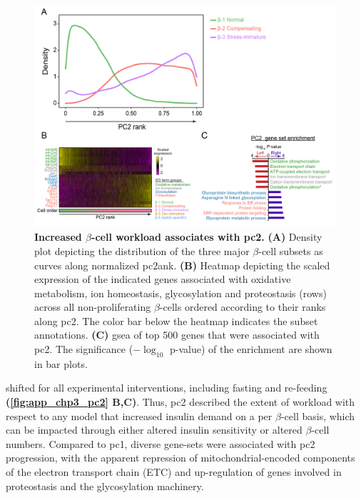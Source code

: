 \begin{figure}[H]
\centering
\includegraphics[width=\linewidth]{Chapter5/Fig/F3-6-03}
\caption[Increased $\beta$-cell workload associates with 2]{\textbf{Increased $\beta$-cell workload associates with \gls{pc}2.} \textbf{(A)} Density plot depicting the distribution of the three major $\beta$-cell subsets as curves along normalized \gls{pc}2ank. \textbf{(B)} Heatmap depicting the scaled expression of the indicated genes associated with oxidative metabolism, ion homeostasis, glycosylation and proteostasis (rows) across all non-proliferating $\beta$-cells ordered according to their ranks along \gls{pc}2. The color bar below the heatmap indicates the subset annotations. \textbf{(C)} \gls{gsea} of top 500 genes that were associated with \gls{pc}2. The significance ($-\log_{10}$ p-value) of the enrichment are shown in bar plots.}
\label{fig:chp3_pc2}
\end{figure}

shifted for all experimental interventions, including fasting and re-feeding \textbf{(\autoref{fig:app_chp3_pc2} B,C)}. Thus, \gls{pc}2 described the extent of workload with respect to any model that increased insulin demand on a per $\beta$-cell basis, which can be impacted through either altered insulin sensitivity or altered $\beta$-cell numbers. Compared to \gls{pc}1, diverse gene-sets were associated with \gls{pc}2 progression, with the apparent repression of mitochondrial-encoded components of the electron transport chain (ETC) and up-regulation of genes involved in proteostasis and the glycosylation machinery.\\ 

